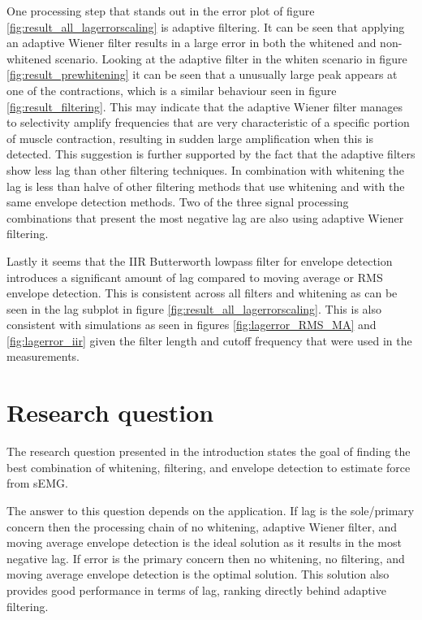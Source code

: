 One processing step that stands out in the error plot of figure \ref{fig:result_all_lagerrorscaling} is adaptive filtering. It can be seen that applying an adaptive Wiener filter results in a large error in both the whitened and non-whitened scenario. Looking at the adaptive filter in the whiten scenario in figure \ref{fig:result_prewhitening} it can be seen that a unusually large peak appears at one of the contractions, which is a similar behaviour seen in figure \ref{fig:result_filtering}. This may indicate that the adaptive Wiener filter manages to selectivity amplify frequencies that are very characteristic of a specific portion of muscle contraction, resulting in sudden large amplification when this is detected. This suggestion is further supported by the fact that the adaptive filters show less lag than other filtering techniques. In combination with whitening the lag is less than halve of other filtering methods that use whitening and with the same envelope detection methods. Two of the three signal processing combinations that present the most negative lag are also using adaptive Wiener filtering.

Lastly it seems that the IIR Butterworth lowpass filter for envelope detection introduces a significant amount of lag compared to moving average or RMS envelope detection. This is consistent across all filters and whitening as can be seen in the lag subplot in figure \ref{fig:result_all_lagerrorscaling}. This is also consistent with simulations as seen in figures \ref{fig:lagerror_RMS_MA} and \ref{fig:lagerror_iir} given the filter length and cutoff frequency that were used in the measurements. 

\section{Research question}
The research question presented in the introduction states the goal of finding the best combination of whitening, filtering, and envelope detection to estimate force from sEMG. 

The answer to this question depends on the application. If lag is the sole/primary concern then the processing chain of no whitening, adaptive Wiener filter, and moving average envelope detection is the ideal solution as it results in the most negative lag. If error is the primary concern then no whitening, no filtering, and moving average envelope detection is the optimal solution. This solution also provides good performance in terms of lag, ranking directly behind adaptive filtering.

